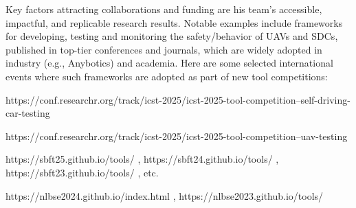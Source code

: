 \documentclass[11pt]{article}
\begin{document}
Key factors attracting collaborations and funding are his team's accessible, impactful, and replicable research results. Notable examples include frameworks for developing, testing and monitoring the safety/behavior of UAVs and SDCs, published in top-tier conferences and journals, which are 
widely adopted in industry (e.g., Anybotics) and academia.  Here are some selected international events where such frameworks are adopted as part of new tool competitions: 
\begin{itemize}
{\fontsize{11}{11.5}\selectfont 
\vspace{-2.5mm}
	\item https://conf.researchr.org/track/icst-2025/icst-2025-tool-competition--self-driving-car-testing
    \vspace{-2.5mm}
	\item https://conf.researchr.org/track/icst-2025/icst-2025-tool-competition--uav-testing
    \vspace{-2.5mm}
	\item https://sbft25.github.io/tools/ ,  https://sbft24.github.io/tools/ , https://sbft23.github.io/tools/ , etc. %
    \vspace{-3mm}
	\item https://nlbse2024.github.io/index.html , https://nlbse2023.github.io/tools/ 
    }
\end{itemize}
\end{document}

